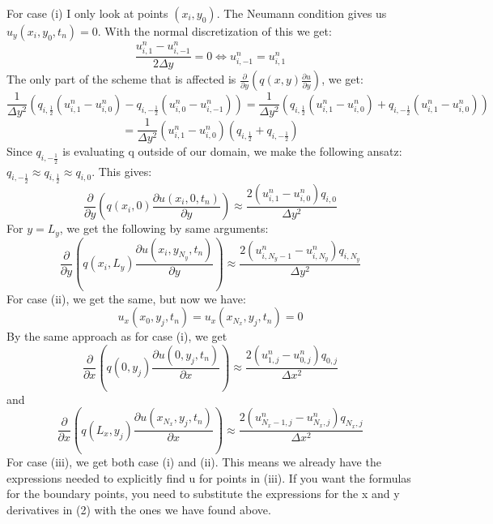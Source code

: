 \documentclass[11pt,a4paper]{report}
\begin{document}
For case (i) I only look at points $(x_i,y_0)$. The Neumann condition gives us $u_y(x_i,y_0,t_n)=0$. With the normal discretization of this we get: $$ \frac{u_{i,1}^n-u_{i,-1}^n}{2\Delta y}= 0 \iff u_{i,-1}^n = u_{i,1}^n $$ The only part of the scheme that is affected is $ \frac{\partial }{\partial y}(q(x,y)\frac{\partial u}{\partial y}) $, we get: $$ \frac{1}{\Delta y^2}(q_{i,\frac{1}{2}}(u_{i,1}^{n}-u_{i,0}^{n})-q_{i,-\frac{1}{2}}(u_{i,0}^{n}-u_{i,-1}^{n})) =\frac{1}{\Delta y^2}(q_{i,\frac{1}{2}}(u_{i,1}^{n}-u_{i,0}^{n})+q_{i,-\frac{1}{2}}(u_{i,1}^{n}-u_{i,0}^{n})) $$ $$=\frac{1}{\Delta y^2}(u_{i,1}^{n}-u_{i,0}^{n})(q_{i,\frac{1}{2}}+q_{i,-\frac{1}{2}}) $$ Since $q_{i,-\frac{1}{2}} $ is evaluating q outside of our domain, we make the following ansatz: $q_{i,-\frac{1}{2}} \approx q_{i,\frac{1}{2}} \approx q_{i,0}$. This gives: $$\frac{\partial }{\partial y}(q(x_i,0)\frac{\partial u(x_i,0,t_n)}{\partial y}) \approx \frac{2(u_{i,1}^{n}-u_{i,0}^{n})q_{i,0}}{\Delta y^2} $$ For $y=L_y$, we get the following by same arguments: $$\frac{\partial }{\partial y}(q(x_i,L_y)\frac{\partial u(x_i,y_{N_y},t_n)}{\partial y}) \approx \frac{2(u_{i,N_y-1}^{n}-u_{i,N_y}^{n})q_{i,N_y}}{\Delta y^2} $$ For case (ii), we get the same, but now we have: $$u_x(x_0,y_j,t_n)=u_x(x_{N_x},y_j,t_n)=0$$ By the same approach as for case (i), we get $$\frac{\partial }{\partial x}(q(0,y_j)\frac{\partial u(0,y_j,t_n)}{\partial x}) \approx \frac{2(u_{1,j}^{n}-u_{0,j}^{n})q_{0,j}}{\Delta x^2} $$ and $$\frac{\partial }{\partial x}(q(L_x,y_j)\frac{\partial u(x_{N_x},y_j,t_n)}{\partial x}) \approx \frac{2(u_{N_x-1,j}^{n}-u_{N_x,j}^{n})q_{N_x,j}}{\Delta x^2} $$ For case (iii), we get both case (i) and (ii). This means we already have the expressions needed to  explicitly find u for points in (iii). If you want the formulas for the boundary points, you need to substitute the expressions for the x and y derivatives in (2) with the ones we have found above.  
\end{document}

